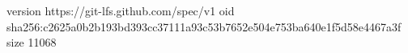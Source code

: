 version https://git-lfs.github.com/spec/v1
oid sha256:c2625a0b2b193bd393cc37111a93c53b7652e504e753ba640e1f5d58e4467a3f
size 11068
